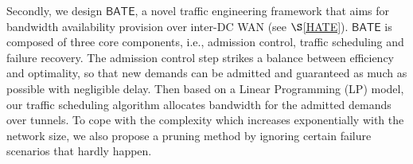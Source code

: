 \documentclass[sigconf]{acmart}
\begin{document}
%

Secondly, we design $\mathsf{BATE}$,
a novel traffic engineering  framework that aims for bandwidth availability provision over inter-DC WAN (see $\S$\ref{HATE}).
$\mathsf{BATE}$ is composed of three core components, i.e., admission control, traffic scheduling and failure recovery. 
The admission control step strikes a balance between efficiency and optimality, so that new demands can be admitted and guaranteed as much as possible with negligible delay.
Then based on a Linear Programming (LP) model, our traffic scheduling algorithm allocates bandwidth for the admitted demands over tunnels.
To cope with the complexity which increases exponentially with the network size,  we also propose a pruning method by ignoring certain failure scenarios that hardly happen.
\end{document}
